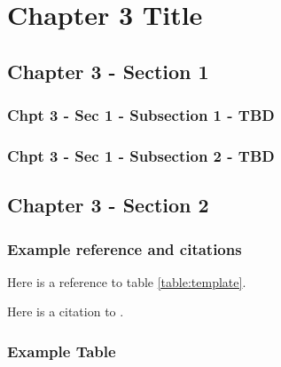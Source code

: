 \chapter[Chapter 3-TBD]{Chapter 3 Title}
\label{sec:chapter3}
\setcounter{secnumdepth}{3}
%
%
\minitoc
%

	\section{Chapter 3 - Section 1}
\label{sec:chapter_3_sec_1}

\subsection{Chpt 3 - Sec 1 - Subsection 1 - TBD}

\subsection{Chpt 3 - Sec 1 - Subsection 2 - TBD}



	\section{Chapter 3 - Section 2}
\label{sec:chapter_3_sec_2}


\subsection{Example reference and citations}


Here is a reference to table \ref{table:template}.

Here is a citation to \cite{cappanera2018momentum}.

\subsection{Example Table}


